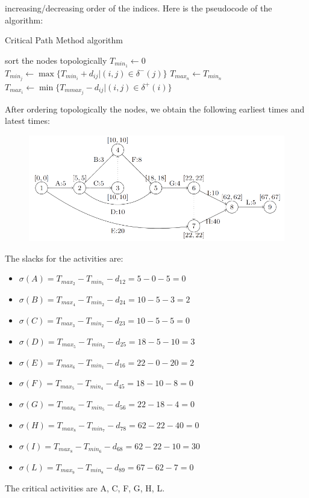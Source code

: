 \documentclass[12pt, a4paper]{report}
\begin{document}
        increasing/decreasing order of the indices. Here is the pseudocode of the algorithm:
        \begin{algorithm}[H]
            \caption{Critical Path Method algorithm}
                \begin{algorithmic}[1]
                    \State sort the nodes topologically
                    \State $T_{min_1} \leftarrow 0$
                        \State $T_{min_j} \leftarrow \max\{T_{min_i} + d_{ij} | (i, j) \in \delta^{-}(j)\}$
                    \EndFor
                    \State $T_{max_n} \leftarrow T_{min_n}$
                    \State $T_{max_i} \leftarrow \min\{T_{mmax_j} - d_{ij} | (i, j) \in \delta^{+}(i)\}$
                \EndFor
                \end{algorithmic}
        \end{algorithm}
        After ordering topologically the nodes, we obtain the following earliest times and latest times:
        \begin{figure}[H]
            \centering
            \includegraphics[width=0.9\linewidth]{images/prog2.png}
        \end{figure}
        The slacks for the activities are: 
        \begin{itemize}
            \item $\sigma(A) = T_{max_2} - T_{min_1} - d_{12} = 5 - 0 - 5 = 0$
            \item $\sigma(B) = T_{max_4} - T_{min_2} - d_{24} = 10 - 5 - 3 = 2$
            \item $\sigma(C) = T_{max_3} - T_{min_2} - d_{23} = 10 - 5 - 5 = 0$
            \item $\sigma(D) = T_{max_5} - T_{min_2} - d_{25} = 18 - 5 - 10 = 3$
            \item $\sigma(E) = T_{max_6} - T_{min_1} - d_{16} = 22 - 0 - 20 = 2$
            \item $\sigma(F) = T_{max_5} - T_{min_4} - d_{45} = 18 - 10 - 8 = 0$
            \item $\sigma(G) = T_{max_6} - T_{min_5} - d_{56} = 22 - 18 - 4 = 0$
            \item $\sigma(H) = T_{max_8} - T_{min_7} - d_{78} = 62 - 22 - 40 = 0$
            \item $\sigma(I) = T_{max_8} - T_{min_6} - d_{68} = 62 - 22 - 10 = 30$
            \item $\sigma(L) = T_{max_9} - T_{min_8} - d_{89} = 67 - 62 - 7 = 0$
        \end{itemize}
        The critical activities are A, C, F, G, H, L.
\end{document}
